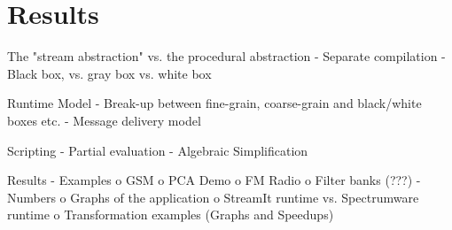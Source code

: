 \section{Results}
\label{sec:results}

The "stream abstraction" vs. the procedural abstraction
-	Separate compilation
-	Black box, vs. gray box vs. white box

Runtime Model
-	Break-up between fine-grain, coarse-grain and black/white boxes etc.
-	Message delivery model

Scripting
-	Partial evaluation
-	Algebraic Simplification 
 
Results
-	Examples
o	GSM
o	PCA Demo
o	FM Radio
o	Filter banks (???)
-	Numbers
o	Graphs of the application
o	StreamIt runtime vs. Spectrumware runtime
o	Transformation examples (Graphs and Speedups)


